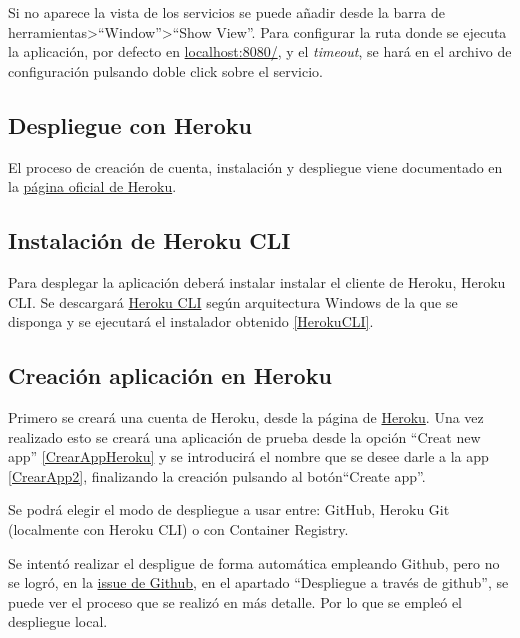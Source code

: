 Si no aparece la vista de los servicios se puede añadir desde la barra de herramientas>``Window''>``Show View''. Para configurar la ruta donde se ejecuta la aplicación, por defecto en \href{http://localhost:8080/}{localhost:8080/}, y el \emph{timeout}, se hará en el archivo de configuración pulsando doble click sobre el servicio.

\subsection{Despliegue con Heroku}
El proceso de creación de cuenta, instalación y despliegue viene documentado en la \href{https://devcenter.heroku.com/articles/getting-started-with-java}{página oficial de Heroku}.

\subsection{Instalación de Heroku CLI}
Para desplegar la aplicación deberá instalar instalar el cliente de Heroku, Heroku CLI. Se descargará \href{https://devcenter.heroku.com/articles/heroku-cli#download-and-install}{Heroku CLI} según arquitectura Windows de la que se disponga y se ejecutará el instalador obtenido \ref{HerokuCLI}.


\subsection{Creación aplicación en Heroku}
Primero se creará una cuenta de Heroku, desde la página de \href{https://dashboard.heroku.com/}{Heroku}. Una vez realizado esto se creará una aplicación de prueba desde la opción ``Creat new app'' \ref{CrearAppHeroku} y se introducirá el nombre que se desee darle a la app \ref{CrearApp2}, finalizando la creación pulsando al botón``Create app''. 


Se podrá elegir el modo de despliegue a usar entre: GitHub, Heroku Git (localmente con Heroku CLI) o con Container Registry.


Se intentó realizar el despligue de forma automática empleando Github, pero no se logró, en la \href{https://github.com/dbo1001/Gestor-TFG-2021/issues/112}{issue de Github}, en el apartado ``Despliegue a través de github'', se puede ver el proceso que se realizó en más detalle. Por lo que se empleó el despliegue local. 

